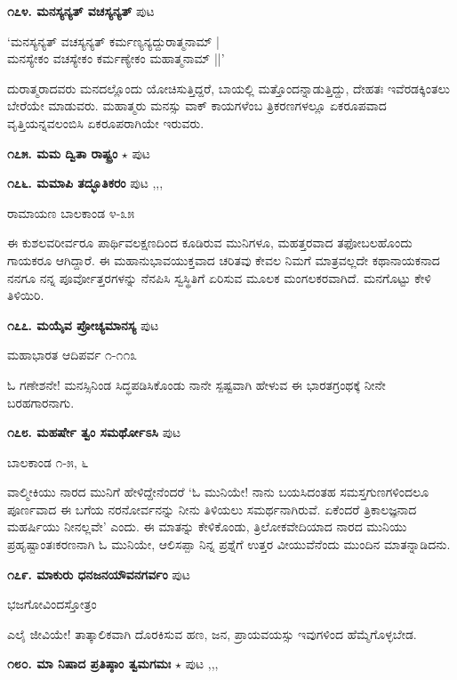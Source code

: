 {\medskip
\noindent\textbf{೧೭೪. ಮನಸ್ಯನ್ಯತ್ ವಚಸ್ಯನ್ಯತ್} \hfill ಪುಟ \pageref{102}

\begin{shloka}
`ಮನಸ್ಯನ್ಯತ್ ವಚಸ್ಯನ್ಯತ್ ಕರ್ಮಣ್ಯನ್ಯದ್ದುರಾತ್ಮನಾಮ್ |\\
ಮನಸ್ಯೇಕಂ ವಚಸ್ಯೇಕಂ ಕರ್ಮಣ್ಯೇಕಂ ಮಹಾತ್ಮನಾಮ್ ||'
\end{shloka}

ದುರಾತ್ಮರಾದವರು ಮನದಲ್ಲೊಂದು ಯೋಚಿಸುತ್ತಿದ್ದರೆ, ಬಾಯಲ್ಲಿ ಮತ್ತೊಂದನ್ನಾಡುತ್ತಿದ್ದು, ದೇಹತಃ ಇವೆರಡಕ್ಕಿಂತಲು ಬೇರೆಯೇ ಮಾಡುವರು. ಮಹಾತ್ಮರು ಮನಸ್ಸು ವಾಕ್ ಕಾಯಗಳೆಂಬ ತ್ರಿಕರಣಗಳಲ್ಲೂ ಏಕರೂಪವಾದ ವೃತ್ತಿಯನ್ನವಲಂಬಿಸಿ ಏಕರೂಪರಾಗಿಯೇ ಇರುವರು.

\medskip
\noindent\textbf{೧೭೫. ಮಮ ದ್ವಿತಾ ರಾಷ್ಟ್ರಂ} $\star$ \hfill ಪುಟ \pageref{148a}

\medskip
\noindent\textbf{೧೭೬. ಮಮಾಪಿ ತದ್ಭೂತಿಕರಂ} \hfill ಪುಟ \pageref{159a},\pageref{168b},\pageref{193a},\pageref{211d}

\hfill ರಾಮಾಯಣ ಬಾಲಕಾಂಡ ೪-೩೫

ಈ ಕುಶಲವರೀರ್ವರೂ ಪಾರ್ಥಿವಲಕ್ಷಣದಿಂದ ಕೂಡಿರುವ ಮುನಿಗಳೂ, ಮಹತ್ತರವಾದ ತಫೋಬಲಹೊಂದು ಗಾಯಕರೂ ಆಗಿದ್ದಾರೆ. ಈ ಮಹಾನುಭಾವಯುಕ್ತವಾದ ಚರಿತವು ಕೇವಲ ನಿಮಗೆ ಮಾತ್ರವಲ್ಲದೇ ಕಥಾನಾಯಕನಾದ ನನಗೂ ನನ್ನ ಪೂರ್ವೋತ್ತರಗಳನ್ನು ನೆನಪಿಸಿ ಸ್ವಸ್ಥಿತಿಗೆ ಏರಿಸುವ ಮೂಲಕ ಮಂಗಲಕರವಾಗಿದೆ. ಮನಗೊಟ್ಟು ಕೇಳಿ ತಿಳಿಯಿರಿ.

\medskip
\noindent\textbf{೧೭೭. ಮಯೈವ ಪ್ರೋಚ್ಯಮಾನಸ್ಯ} \hfill ಪುಟ \pageref{119c}

\hfill ಮಹಾಭಾರತ ಆದಿಪರ್ವ ೧-೧೧೩

ಓ ಗಣೇಶನೇ! ಮನಸ್ಸಿನಿಂಡ ಸಿದ್ಧಪಡಿಸಿಕೊಂಡು ನಾನೇ ಸ್ಪಷ್ಟವಾಗಿ ಹೇಳುವ ಈ ಭಾರತಗ್ರಂಥಕ್ಕೆ ನೀನೇ ಬರಹಗಾರನಾಗು.

\medskip
\noindent\textbf{೧೭೮. ಮಹರ್ಷೇ ತ್ವಂ ಸಮರ್ಥೋಽಸಿ} \hfill ಪುಟ \pageref{246a}

\hfill ಬಾಲಕಾಂಡ ೧-೫, ೬

ವಾಲ್ಮೀಕಿಯು ನಾರದ ಮುನಿಗೆ ಹೇಳಿದ್ದೇನೆಂದರೆ `ಓ ಮುನಿಯೇ! ನಾನು ಬಯಸಿದಂತಹ ಸಮಸ್ತಗುಣಗಳಿಂದಲೂ ಪೂರ್ಣವಾದ ಈ ಬಗೆಯ ನರನೋರ್ವನನ್ನು ನೀನು ತಿಳಿಯಲು ಸಮರ್ಥನಾಗಿರುವೆ. ಏಕೆಂದರೆ ತ್ರಿಕಾಲಜ್ಞನಾದ ಮಹರ್ಷಿಯು ನೀನಲ್ಲವೇ' ಎಂದು. ಈ ಮಾತನ್ನು ಕೇಳಿಕೊಂಡು, ತ್ರಿಲೋಕವೇದಿಯಾದ ನಾರದ ಮುನಿಯು ಪ್ರಹೃಷ್ಟಾಂತಃಕರಣನಾಗಿ ಓ ಮುನಿಯೇ, ಆಲಿಸಪ್ಪಾ ನಿನ್ನ ಪ್ರಶ್ನೆಗೆ ಉತ್ತರ ವೀಯುವೆನೆಂದು ಮುಂದಿನ ಮಾತನ್ನಾಡಿದನು.

\medskip
\noindent\textbf{೧೭೯. ಮಾಕುರು ಧನಜನಯೌವನಗರ್ವಂ} \hfill ಪುಟ \pageref{60}

\hfill ಭಜಗೋವಿಂದಸ್ತೋತ್ರಂ 

ಎಲೈ ಜೀವಿಯೇ! ತಾತ್ಕಾಲಿಕವಾಗಿ ದೊರಕಿಸುವ ಹಣ, ಜನ, ಪ್ರಾಯವಯಸ್ಸು ಇವುಗಳಿಂದ ಹೆಮ್ಮೆಗೊಳ್ಳಬೇಡ.

\medskip
\noindent\textbf{೧೮೦. ಮಾ ನಿಷಾದ ಪ್ರತಿಷ್ಠಾಂ ತ್ವಮಗಮಃ} $\star$ \hfill ಪುಟ \pageref{20a},\pageref{157b},\pageref{166},\pageref{200}

}

